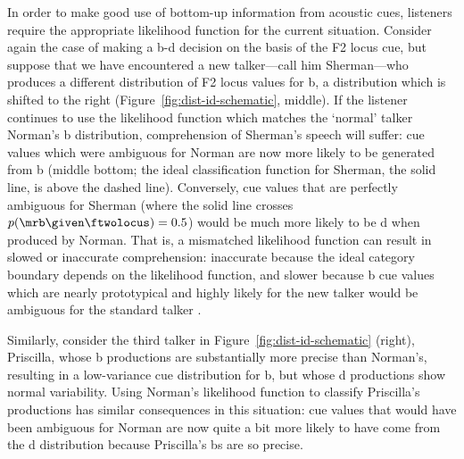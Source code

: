 In order to make good use of bottom-up information from acoustic cues,
listeners require the appropriate likelihood function for the current situation.
Consider again the case of making a \ph b-\ph d decision on the basis of the F2 locus cue, but suppose that we have encountered a new talker---call him Sherman---who produces a different distribution of F2 locus values for \ph b, a distribution which is shifted to the right (Figure~\ref{fig:dist-id-schematic}, middle).  If the listener continues to use the likelihood function which matches the `normal' talker Norman's \ph b distribution, comprehension of Sherman's speech will suffer: cue values which were ambiguous for Norman are now more likely to be generated from \ph b (middle bottom; the ideal classification function for Sherman, the solid line, is above the dashed line).  Conversely, cue values that are perfectly ambiguous for Sherman (where the solid line crosses $p(\mrb \given \ftwolocus)=0.5$) would be much more likely to be \ph d when produced by Norman.  That is, a mismatched likelihood function can result in slowed or inaccurate comprehension: inaccurate because the ideal category boundary depends on the likelihood function, and slower because \ph b cue values which are nearly prototypical and highly likely for the new talker would be ambiguous for the standard talker \autocite[the resulting uncertainty slows processing in this sort of task;][]{Clayards2008,McMurray2002}.

Similarly, consider the third talker in Figure~\ref{fig:dist-id-schematic} (right), Priscilla, whose \ph b productions are substantially more precise than Norman's, resulting in a low-variance cue distribution for \ph b, but whose \ph d productions show normal variability.  Using Norman's likelihood function to classify Priscilla's productions has similar consequences in this situation: cue values that would have been ambiguous for Norman are now quite a bit more likely to have come from the \ph d distribution because Priscilla's \ph bs are so precise.

